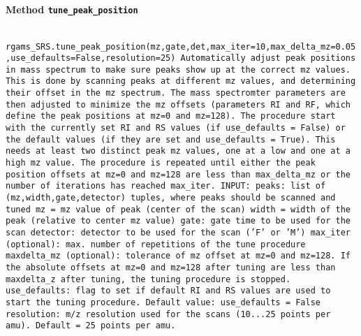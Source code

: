 \paragraph{Method \texttt{tune_peak_position}}
\vspace{1ex}
\texttt{\newline
rgams_SRS.tune_peak_position(mz,gate,det,max_iter=10,max_delta_mz=0.05,use_defaults=False,resolution=25)\newline
\newline
Automatically adjust peak positions in mass spectrum to make sure peaks show up at the correct mz values. This is done by scanning peaks at different mz values, and determining their offset in the mz spectrum. The mass spectromter parameters are then adjusted to minimize the mz offsets (parameters RI and RF, which define the peak positions at mz=0 and mz=128). The procedure start with the currently set RI and RS values (if use_defaults = False) or the default values (if they are set and use_defaults = True). This needs at least two distinct peak mz values, one at a low and one at a high mz value. The procedure is repeated until either the peak position offsets at mz=0 and mz=128 are less than max_delta_mz or the number of iterations has reached max_iter.\newline
\newline
INPUT:\newline
peaks: list of (mz,width,gate,detector) tuples, where peaks should be scanned and tuned\newline
mz = mz value of peak (center of the scan)\newline
width = width of the peak (relative to center mz value)\newline
gate: gate time to be used for the scan\newline
detector: detector to be used for the scan ('F' or 'M')\newline
max_iter (optional): max. number of repetitions of the tune procedure\newline
maxdelta_mz (optional): tolerance of mz offset at mz=0 and mz=128. If the absolute offsets at mz=0 and mz=128 after tuning are less than maxdelta_z after tuning, the tuning procedure is stopped.\newline
use_defaults: flag to set if default RI and RS values are used to start the tuning procedure. Default value: use_defaults = False\newline
resolution: m/z resolution used for the scans (10...25 points per amu). Default = 25 points per amu.\newline
}
